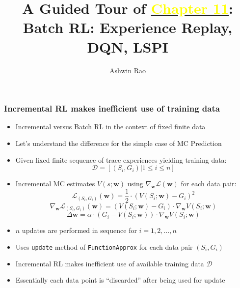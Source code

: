 \documentclass[handout]{beamer}
\title[Batch RL Chapter]{A Guided Tour of \href{http://stanford.edu/~ashlearn/RLForFinanceBook/book.pdf}{\underline{\textcolor{yellow}{Chapter 11}}}: \\ Batch RL: Experience Replay, DQN, LSPI} %
\author{Ashwin Rao} %
\institute[Stanford] %
{ICME, Stanford University
}
\date %
\begin{document}
\lstset{language=Python}  
\begin{frame}
\titlepage %
\end{frame}


\begin{frame}
\frametitle{Incremental RL makes inefficient use of training data}
\begin{itemize}[<+->]
\item Incremental versus Batch RL in the context of fixed finite data
\item Let's understand the difference for the simple case of MC Prediction
\item Given fixed finite sequence of trace experiences yielding training data:
$$\mathcal{D} = [(S_i, G_i) | 1 \leq i \leq n]$$
\item Incremental MC estimates $V(s;\bm{w})$ using $\nabla_{\bm{w}} \mathcal{L}(\bm{w})$ for each data pair:
$$\mathcal{L}_{(S_i, G_i)}(\bm{w}) = \frac 1 2 \cdot (V(S_i; \bm{w}) - G_i)^2$$
$$\nabla_{\bm{w}} \mathcal{L}_{(S_i, G_i)}(\bm{w}) = (V(S_i; \bm{w}) - G_i) \cdot \nabla_{\bm{w}} V(S_i; \bm{w})$$
$$\Delta \bm{w} = \alpha \cdot (G_i - V(S_i; \bm{w})) \cdot \nabla_{\bm{w}} V(S_i; \bm{w})$$
\item $n$ updates are performed in sequence for $i = 1, 2, \ldots ,n$
\item Uses  \lstinline{update} method of \lstinline{FunctionApprox} for each data pair $(S_i, G_i)$
\item Incremental RL makes inefficient use of available training data $\mathcal{D}$
\item Essentially each data point is ``discarded'' after being used for update
\end{itemize}
\end{frame}
\end{document}
